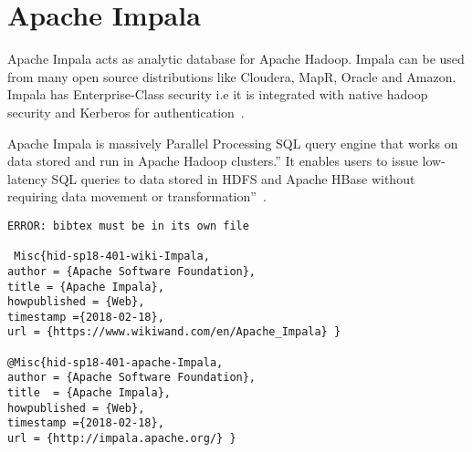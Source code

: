 \section{Apache Impala}

Apache Impala acts as analytic database for Apache Hadoop. Impala can be used
from many open source distributions like Cloudera, MapR, Oracle and Amazon.
Impala has Enterprise-Class security i.e it is integrated with native hadoop
security and Kerberos for authentication~\cite{hid-sp18-401-wiki-Impala}.

Apache Impala is massively Parallel Processing SQL query engine that works on
data stored and run in Apache Hadoop clusters.'' It enables users to issue low-
latency SQL queries to data stored in HDFS and Apache HBase without requiring
data movement or transformation''~\cite{hid-sp18-401-apache-Impala}.

\begin{verbatim}
ERROR: bibtex must be in its own file

 Misc{hid-sp18-401-wiki-Impala,        
author = {Apache Software Foundation},
title = {Apache Impala},        
howpublished = {Web},        
timestamp ={2018-02-18},        
url = {https://www.wikiwand.com/en/Apache_Impala} }

@Misc{hid-sp18-401-apache-Impala,        
author = {Apache Software Foundation},
title  = {Apache Impala},        
howpublished = {Web},        
timestamp ={2018-02-18},        
url = {http://impala.apache.org/} }

\end{verbatim}